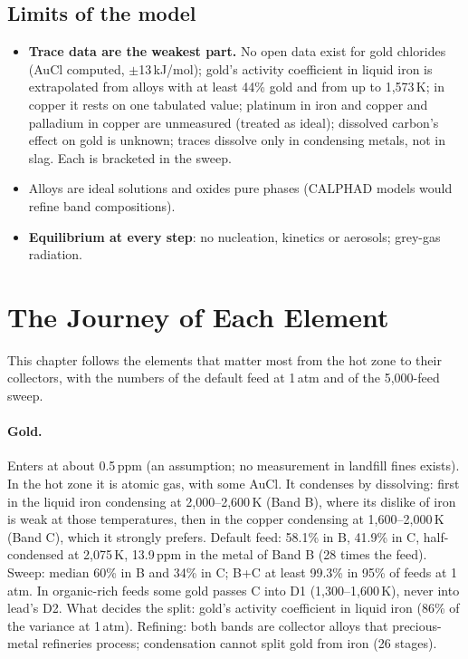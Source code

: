 \documentclass[11pt,a4paper]{article}
\begin{document}
\subsection{Limits of the model}
\begin{itemize}
\item \textbf{Trace data are the weakest part.} No open data exist for gold chlorides (AuCl computed, $\pm$13\,kJ/mol); gold's activity coefficient in liquid iron is extrapolated from alloys with at least 44\% gold and from up to 1,573\,K; in copper it rests on one tabulated value; platinum in iron and copper and palladium in copper are unmeasured (treated as ideal); dissolved carbon's effect on gold is unknown; traces dissolve only in condensing metals, not in slag. Each is bracketed in the sweep.
\item Alloys are ideal solutions and oxides pure phases (CALPHAD models would refine band compositions).
\item \textbf{Equilibrium at every step}: no nucleation, kinetics or aerosols; grey-gas radiation.
\end{itemize}

\section{The Journey of Each Element}\label{ch:journeys}
This chapter follows the elements that matter most from the hot zone to their collectors, with the numbers of the default feed at 1\,atm and of the 5,000-feed sweep.

\paragraph{Gold.} Enters at about 0.5\,ppm (an assumption; no measurement in landfill fines exists). In the hot zone it is atomic gas, with some AuCl. It condenses by dissolving: first in the liquid iron condensing at 2,000--2,600\,K (Band B), where its dislike of iron is weak at those temperatures, then in the copper condensing at 1,600--2,000\,K (Band C), which it strongly prefers. Default feed: 58.1\% in B, 41.9\% in C, half-condensed at 2,075\,K, 13.9\,ppm in the metal of Band B (28 times the feed). Sweep: median 60\% in B and 34\% in C; B+C at least 99.3\% in 95\% of feeds at 1\,atm. In organic-rich feeds some gold passes C into D1 (1,300--1,600\,K), never into lead's D2. What decides the split: gold's activity coefficient in liquid iron (86\% of the variance at 1\,atm). Refining: both bands are collector alloys that precious-metal refineries process; condensation cannot split gold from iron (26 stages).
\end{document}
